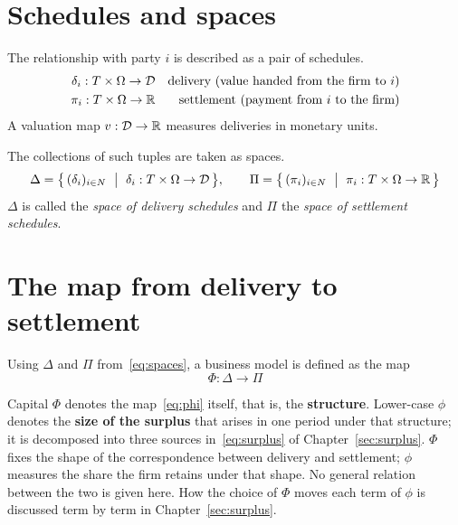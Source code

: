 \section{Schedules and spaces}
\label{sec:schedules}

The relationship with party $i$ is described as a pair of schedules.
\begin{align}
\delta_i : T\times\Omega \to \mathcal{D} && \text{delivery (value handed from the firm to $i$)} \\
\pi_i : T\times\Omega \to \mathbb{R} && \text{settlement (payment from $i$ to the firm)}
\end{align}
A valuation map $v:\mathcal{D}\to\mathbb{R}$ measures deliveries in monetary units.

The collections of such tuples are taken as spaces.
\begin{equation}
\Delta = \bigl\{\, (\delta_i)_{i\in N} \ \bigm| \ \delta_i : T\times\Omega\to\mathcal{D} \,\bigr\},
\qquad
\Pi = \bigl\{\, (\pi_i)_{i\in N} \ \bigm| \ \pi_i : T\times\Omega\to\R \,\bigr\}
\label{eq:spaces}
\end{equation}
$\Delta$ is called the \emph{space of delivery schedules} and $\Pi$ the
\emph{space of settlement schedules}.

\section{The map from delivery to settlement}

\begin{definition}
Using $\Delta$ and $\Pi$ from~\eqref{eq:spaces}, a business model is defined as the map
\begin{equation}
\Phi : \Delta \longrightarrow \Pi
\label{eq:phi}
\end{equation}
\end{definition}

\begin{remark}
\label{rem:Phi-vs-phi}
Capital $\Phi$ denotes the map~\eqref{eq:phi} itself, that is, the \textbf{structure}.
Lower-case $\phi$ denotes the \textbf{size of the surplus} that arises in one period under
that structure; it is decomposed into three sources in~\eqref{eq:surplus} of
Chapter~\ref{sec:surplus}. $\Phi$ fixes the shape of the correspondence between delivery
and settlement; $\phi$ measures the share the firm retains under that shape. No general
relation between the two is given here. How the choice of $\Phi$ moves each term of $\phi$
is discussed term by term in Chapter~\ref{sec:surplus}.
\end{remark}


